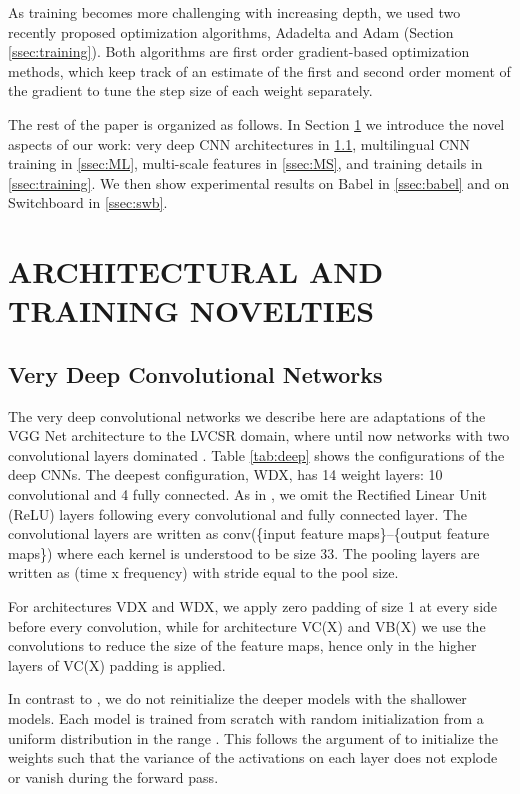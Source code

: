 \documentclass{article}
\begin{document}
As training becomes more challenging with increasing depth,
we used two recently proposed optimization algorithms, Adadelta \cite{zeiler2012adadelta} and Adam \cite{kingma2014adam}
(Section \ref{ssec:training}).
Both algorithms are first order gradient-based optimization methods, which keep track of an estimate of
the first and second order moment of the gradient to tune the step size of each weight separately.

The rest of the paper is organized as follows.
In Section \ref{sec:novelties} we introduce the novel aspects of our work:
very deep CNN architectures in \ref{ssec:deep}, multilingual CNN training in \ref{ssec:ML},
multi-scale features in \ref{ssec:MS}, and training details in \ref{ssec:training}.
We then show experimental results on Babel in \ref{ssec:babel} and on Switchboard in \ref{ssec:swb}.

\section{ARCHITECTURAL AND TRAINING NOVELTIES}
\label{sec:novelties}

\subsection{Very Deep Convolutional Networks}
\label{ssec:deep}
The very deep convolutional networks we describe here are adaptations of the VGG Net
architecture \cite{simonyan2014very} to the LVCSR domain, where until now
networks with two convolutional layers dominated \cite{sainath2013deep, soltau2014joint, saon2015ibm}.
Table \ref{tab:deep} shows the configurations of the deep CNNs.
The deepest configuration, WDX, has 14 weight layers: 10 convolutional and 4 fully connected.
As in \cite{simonyan2014very}, we omit the Rectified Linear Unit (ReLU) layers following
every convolutional and fully connected layer.
The convolutional layers are written as conv(\{input feature maps\}--\{output feature maps\}) where 
each kernel is understood to be size 33.
The pooling layers are written as (time x frequency) with stride equal to the pool size.

For architectures VDX and WDX, we apply zero padding of size 1 at every side before every convolution,
while for architecture VC(X) and VB(X) we use the convolutions to reduce the size of the feature maps, 
hence only in the higher layers of VC(X) padding is applied.

In contrast to \cite{simonyan2014very}, we do not reinitialize the deeper models with the shallower models.
Each model is trained from scratch with random initialization from a uniform distribution in the range 
.
This follows the argument of \cite{glorot2010understanding} to initialize the weights such that
the variance of the activations on each layer does not explode or vanish during the forward pass.
\end{document}
